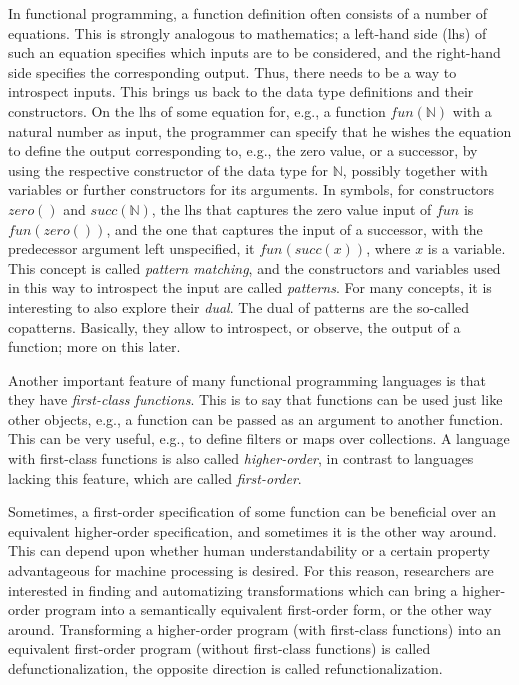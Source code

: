 In functional programming, a function definition often consists of a number of equations. This is strongly analogous to mathematics; a left-hand side (lhs) of such an equation specifies which inputs are to be considered, and the right-hand side specifies the corresponding output. Thus, there needs to be a way to introspect inputs. This brings us back to the data type definitions and their constructors. On the lhs of some equation for, e.g., a function $fun(\mathbb{N})$ with a natural number as input, the programmer can specify that he wishes the equation to define the output corresponding to, e.g., the zero value, or a successor, by using the respective constructor of the data type for $\mathbb{N}$, possibly together with variables or further constructors for its arguments. In symbols, for constructors $zero()$ and $succ(\mathbb{N})$, the lhs that captures the zero value input of $fun$ is $fun(zero())$, and the one that captures the input of a successor, with the predecessor argument left unspecified, it $fun(succ(x))$, where $x$ is a variable. This concept is called \textit{pattern matching}, and the constructors and variables used in this way to introspect the input are called \textit{patterns}. For many concepts, it is interesting to also explore their \textit{dual}. The dual of patterns are the so-called copatterns. Basically, they allow to introspect, or observe, the output of a function; more on this later.

Another important feature of many functional programming languages is that they have \textit{first-class functions}. This is to say that functions can be used just like other objects, e.g., a function can be passed as an argument to another function. This can be very useful, e.g., to define filters or maps over collections. A language with first-class functions is also called \textit{higher-order}, in contrast to languages lacking this feature, which are called \textit{first-order}.

Sometimes, a first-order specification of some function can be beneficial over an equivalent higher-order specification, and sometimes it is the other way around. This can depend upon whether human understandability or a certain property advantageous for machine processing is desired. For this reason, researchers are interested in finding and automatizing transformations which can bring a higher-order program into a semantically equivalent first-order form, or the other way around. Transforming a higher-order program (with first-class functions) into an equivalent first-order program (without first-class functions) is called defunctionalization, the opposite direction is called refunctionalization.

